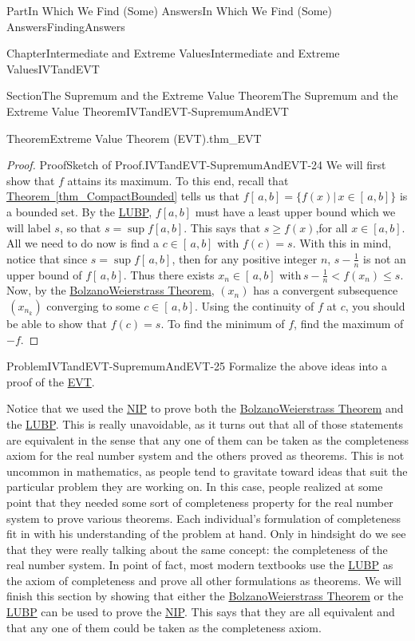 \documentclass[oneside,10pt,]{book}
\newcommand{\xreffont}{\relax}
\numberwithin{equation}{part}
\newcommand{\lt}{<}
\begin{document}
\begin{partptx}{Part}{In Which We Find (Some) Answers}{}{In Which We Find (Some) Answers}{}{}{FindingAnswers}
\begin{chapterptx}{Chapter}{Intermediate and Extreme Values}{}{Intermediate and Extreme Values}{}{}{IVTandEVT}
\begin{sectionptx}{Section}{The Supremum and the Extreme Value Theorem}{}{The Supremum and the Extreme Value Theorem}{}{}{IVTandEVT-SupremumAndEVT}
\begin{theorem}{Theorem}{Extreme Value Theorem (EVT).}{}{thm_EVT}
\end{theorem}
\begin{proof}{Proof}{Sketch of Proof.}{IVTandEVT-SupremumAndEVT-24}
We will first show that \(f\) attains its maximum. To this end, recall that \hyperref[thm_CompactBounded]{Theorem~{\xreffont\ref{thm_CompactBounded}}} tells us that \(f[\,a,b]=\{f(x)|\,x\in[\,a,b]\}\) is a bounded set. By the \hyperref[thm_LUB]{LUBP}, \(f[a,b]\) must have a least upper bound which we will label \(s\), so that \(s=\sup f[a,b]\). This says that \(s\geq f(x)\),for all \(x\in[a,b]\). All we need to do now is find a \(c\in[\,a,b]\) with \(f(c)=s\). With this in mind, notice that since \(s=\sup f[\,a,b]\), then for any positive integer \(n\), \(s-\frac{1}{n}\) is not an upper bound of \(f[\,a,b]\). Thus there exists \(x_n\in[\,a,b]\) with\(\,s-\frac{1}{n}\lt f(x_n)\leq s\). Now, by the \hyperref[BolzanoWeierstrass]{Bolzano\textendash{}Weierstrass Theorem}, \(\left(x_n\right)\) has a convergent subsequence\(\,\left(x_{n_k}\right)\) converging to some \(c\in[\,a,b]\). Using the continuity of \(f\) at \(c\), you should be able to show that \(f(c)=s\). To find the minimum of \(f\), find the maximum of \(-f\).%
\end{proof}
\begin{problem}{Problem}{}{IVTandEVT-SupremumAndEVT-25}%
Formalize the above ideas into a proof of the \hyperref[thm_EVT]{EVT}.%
\end{problem}
Notice that we used the \hyperref[NIP]{NIP} to prove both the \hyperref[BolzanoWeierstrass]{Bolzano\textendash{}Weierstrass Theorem} and the \hyperref[thm_LUB]{LUBP}. This is really unavoidable, as it turns out that all of those statements are equivalent in the sense that any one of them can be taken as the completeness axiom for the real number system and the others proved as theorems.  This is not uncommon in mathematics, as people tend to gravitate toward ideas that suit the particular problem they are working on.  In this case, people realized at some point that they needed some sort of completeness property for the real number system to prove various theorems.  Each individual's formulation of completeness fit in with his understanding of the problem at hand.  Only in hindsight do we see that they were really talking about the same concept: the completeness of the real number system.  In point of fact, most modern textbooks use the \hyperref[thm_LUB]{LUBP} as the axiom of completeness and prove all other formulations as theorems.  We will finish this section by showing that either the \hyperref[BolzanoWeierstrass]{Bolzano\textendash{}Weierstrass Theorem} or the \hyperref[thm_LUB]{LUBP} can be used to prove the \hyperref[NIP]{NIP}. This says that they are all equivalent and that any one of them could be taken as the completeness axiom.%

\end{sectionptx}
\end{chapterptx}
\end{partptx}
\end{document}
